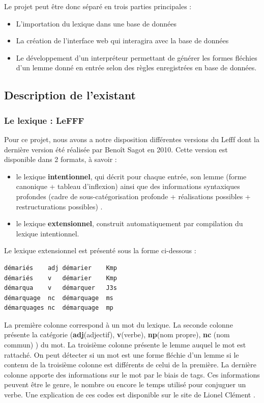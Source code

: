 \documentclass[12pt,a4paper]{article}
\begin{document}
Le projet peut être donc séparé en trois parties principales : 
\begin{itemize}
    \item L'importation du lexique dans une base de données
    \item La création de l'interface web qui interagira avec la base de données
    \item Le développement d'un interpréteur permettant de générer les formes fléchies d'un lemme donné en entrée selon des règles enregistrées en base de données.
\end{itemize}

\subsection{Description de l'existant}
\subsubsection{Le lexique : LeFFF}
Pour ce projet, nous avons a notre disposition différentes versions du Lefff dont la dernière version été réalisée par Benoît Sagot en 2010. Cette version est disponible dans 2 formats, à savoir \cite{lefff_int} :
\begin{itemize}
\item le lexique \textbf{intentionnel}, qui décrit pour chaque entrée, son lemme (forme canonique + tableau d'inflexion) ainsi que des informations syntaxiques profondes (cadre de sous-catégorisation profonde + réalisations possibles + restructurations possibles) .
\item le lexique \textbf{extensionnel}, construit automatiquement par compilation du lexique intentionnel.
\end{itemize} 

\smallbreak
Le lexique extensionnel est présenté sous la forme ci-dessous :
\begin{verbatim}
démariés	adj	démarier	Kmp
démariés	v	démarier	Kmp
démarqua	v	démarquer	J3s
démarquage	nc	démarquage	ms
démarquages	nc	démarquage	mp
\end{verbatim}

\smallbreak La première colonne correspond à un mot du lexique. 
\smallbreak La seconde colonne présente la catégorie (\textbf{adj}(adjectif), \textbf{v}(verbe), \textbf{np}(nom propre), \textbf{nc} (nom commun) ) du mot.
\smallbreak La troisième colonne présente le lemme auquel le mot est rattaché.
On peut détecter si un mot est une forme fléchie d'un lemme si le contenu de la troisième colonne est différents de celui de la première.
\smallbreak La dernière colonne apporte des informations sur le mot par le biais de tags. Ces informations peuvent être
le genre, le nombre ou encore le temps utilisé pour conjuguer un verbe.
Une explication de ces codes est disponible sur le site de Lionel Clément \cite{tagset}.
\end{document}
